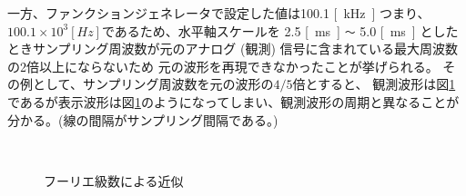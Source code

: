 一方、ファンクションジェネレータで設定した値は100.1 \si{[kHz]} 
つまり、$100.1\times10^3 \si{[Hz]}$であるため、水平軸スケールを 2.5 \si{[\milli s]} \verb|～| 5.0 \si{[\milli s]} としたときサンプリング周波数が元のアナログ (観測) 信号に含まれている最大周波数の2倍以上にならないため
元の波形を再現できなかったことが挙げられる。
その例として、サンプリング周波数を元の波形の$4/5$倍とすると、
観測波形は図\ref{im8}であるが表示波形は図\ref{im8}のようになってしまい、観測波形の周期と異なることが分かる。(線の間隔がサンプリング間隔である。)

\begin{figure}[htb]
  \begin{center}
    ~
   \caption{フーリエ級数による近似}
   \label{im8}
   \end{center}
\end{figure}

